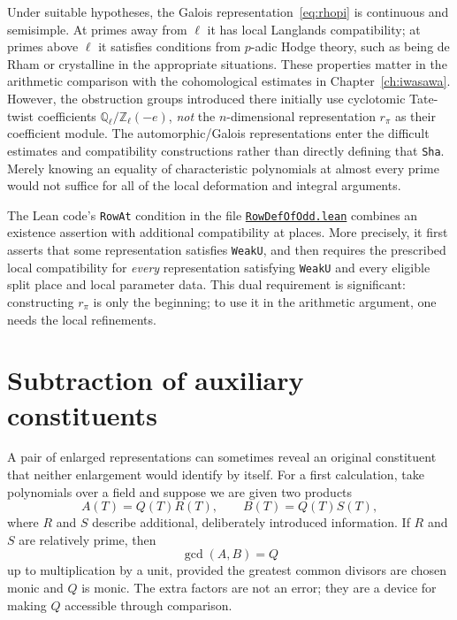 \documentclass[11pt,openany,oneside]{scrbook}
\theoremstyle{definition}
\theoremstyle{remark}
\newcommand{\QQ}{\mathbb Q}
\newcommand{\ZZ}{\mathbb Z}
\newcommand{\baseurl}{https://github.com/CocoSgt/riemann-hypothesis-lean/blob/7cbf7a0c32fca1badf05931879a37c3f8a2b03b4/}
\newcommand{\sourcefile}[2]{\href{\baseurl#1}{\texttt{#2}}}
\begin{document}
Under suitable hypotheses, the Galois representation~\eqref{eq:rhopi} is continuous and semisimple. At primes away from $\ell$ it has local Langlands compatibility; at primes above $\ell$ it satisfies conditions from $p$-adic Hodge theory, such as being de Rham or crystalline in the appropriate situations. These properties matter in the arithmetic comparison with the cohomological estimates in Chapter~\ref{ch:iwasawa}. However, the obstruction groups introduced there initially use cyclotomic Tate-twist coefficients $\QQ_\ell/\ZZ_\ell(-e)$, \emph{not} the $n$-dimensional representation $r_\pi$ as their coefficient module. The automorphic/Galois representations enter the difficult estimates and compatibility constructions rather than directly defining that \texttt{Sha}. Merely knowing an equality of characteristic polynomials at almost every prime would not suffice for all of the local deformation and integral arguments.

The Lean code's \texttt{RowAt} condition in the file
\sourcefile{src/Development/AutomorphicArithmetic/Foundations/GaloisRepresentations/ThetaParseval/SplitLineSubtraction/RowDefOfOdd.lean}{RowDefOfOdd.lean}
combines an existence assertion with additional compatibility at places. More precisely, it first asserts that some representation satisfies \texttt{WeakU}, and then requires the prescribed local compatibility for \emph{every} representation satisfying \texttt{WeakU} and every eligible split place and local parameter data. This dual requirement is significant: constructing $r_\pi$ is only the beginning; to use it in the arithmetic argument, one needs the local refinements.

\section{Subtraction of auxiliary constituents}
A pair of enlarged representations can sometimes reveal an original constituent that neither enlargement would identify by itself. For a first calculation, take polynomials over a field and suppose we are given two products
\[
A(T)=Q(T)R(T),\qquad B(T)=Q(T)S(T),
\]
where $R$ and $S$ describe additional, deliberately introduced information. If $R$ and $S$ are relatively prime, then
\begin{equation}\label{eq:gcd}
\gcd(A,B)=Q
\end{equation}
up to multiplication by a unit, provided the greatest common divisors are chosen monic and $Q$ is monic. The extra factors are not an error; they are a device for making $Q$ accessible through comparison.
\end{document}
